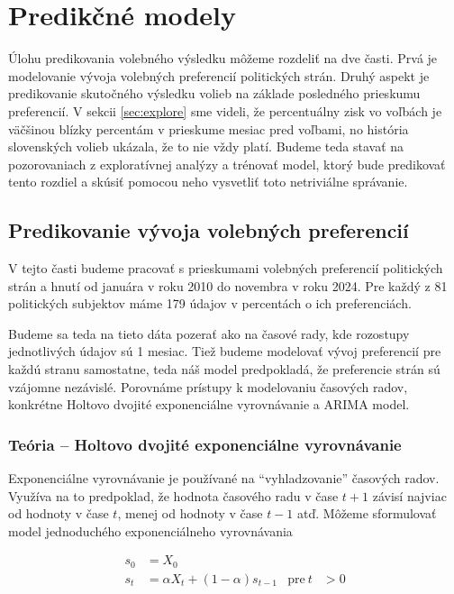 \documentclass[main.tex]{subfiles}
\begin{document}
	
\section{Predikčné modely}	
\label{sec:models}

Úlohu predikovania volebného výsledku môžeme rozdeliť na dve časti. Prvá je modelovanie vývoja volebných preferencií politických strán. Druhý aspekt je predikovanie skutočného výsledku volieb na základe posledného prieskumu preferencií. V sekcii \ref{sec:explore} sme videli, že percentuálny zisk vo voľbách je väčšinou blízky percentám v prieskume mesiac pred voľbami, no história slovenských volieb ukázala, že to nie vždy platí. Budeme teda stavať na pozorovaniach z exploratívnej analýzy a trénovať model, ktorý bude predikovať tento rozdiel a skúsiť pomocou neho vysvetliť toto netriviálne správanie. 

\subsection{Predikovanie vývoja volebných preferencií}

V tejto časti budeme pracovať s prieskumami volebných preferencií politických strán a hnutí od januára v roku 2010 do novembra v roku 2024. Pre každý z 81 politických subjektov máme 179 údajov v percentách o ich preferenciách. 

Budeme sa teda na tieto dáta pozerať ako na časové rady, kde rozostupy jednotlivých údajov sú 1 mesiac. Tiež budeme modelovať vývoj preferencií pre každú stranu samostatne, teda náš model predpokladá, že preferencie strán sú vzájomne nezávislé. Porovnáme prístupy k modelovaniu časových radov, konkrétne Holtovo dvojité exponenciálne vyrovnávanie a ARIMA model.


\subsubsection{Teória -- Holtovo dvojité exponenciálne vyrovnávanie} 

Exponenciálne vyrovnávanie je používané na \enquote{vyhladzovanie} časových radov. Využíva na to predpoklad, že hodnota časového radu v čase $t+1$ závisí najviac od hodnoty v čase $t$, menej od hodnoty v čase $t-1$ atď. Môžeme sformulovať model jednoduchého exponenciálneho vyrovnávania

\begin{align*}
	s_0 &= X_0 \\
	s_t &= \alpha X_t + (1-\alpha) s_{t-1}  & \text{pre}~t&>0 
\end{align*}
\end{document}
